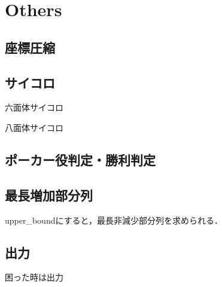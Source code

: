 \section{Others}

\subsection{座標圧縮}


\subsection{サイコロ}
六面体サイコロ

八面体サイコロ


\subsection{ポーカー役判定・勝利判定}


\subsection{最長増加部分列}
upper_boundにすると，最長非減少部分列を求められる．


\subsection{出力}
困った時は出力

